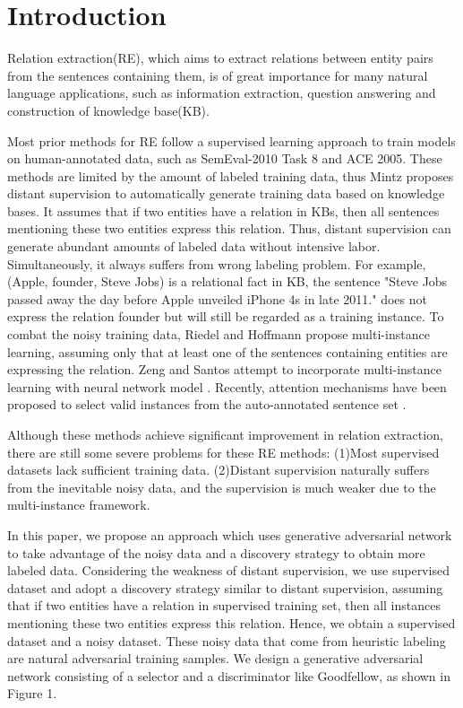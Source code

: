 \documentclass[conference]{IEEEtran}
\begin{document}
\section{Introduction}
Relation extraction(RE), which aims to extract relations between entity pairs from the sentences containing them, is of great importance for many
natural language applications, such as information extraction, question answering and 
construction of knowledge base(KB)\cite{Fader2011IdentifyingRF, Xu2016Question, Bollacker2008FreebaseAC}.

Most prior methods for RE follow a supervised learning approach to train models on human-annotated data, such as SemEval-2010 Task 8\cite{hendrickx2009semeval} and ACE 2005\cite{Ace2005}.
These methods are limited by the amount of labeled training data, thus Mintz\cite{mintz2009distant} proposes distant supervision to automatically generate training data based on knowledge bases.
It assumes that if two entities have a relation in KBs, then all sentences mentioning these two entities express this relation.
Thus, distant supervision can generate abundant amounts of labeled data without intensive labor.
Simultaneously, it always suffers from wrong labeling problem.
For example, (Apple, founder, Steve Jobs) is a relational fact in KB, the sentence "Steve Jobs passed away the day before Apple unveiled iPhone 4s in late 2011." does not express the relation founder but will still be regarded as a training instance.
To combat the noisy training data, Riedel and Hoffmann \cite{riedel2010modeling, hoffmann2011knowledge} propose multi-instance learning, assuming only that at least one of the sentences containing
entities are expressing the relation.
Zeng and Santos attempt to incorporate multi-instance learning with neural network model \cite{zeng2015distant, zeng2016incorporating, santos2015classifying}.
Recently, attention mechanisms have been proposed to select valid instances from the auto-annotated sentence set \cite{lin2016neural, ZHOU2018240}.

Although these methods achieve significant improvement in relation extraction, there are still some severe problems for these RE methods:
(1)Most supervised datasets lack sufficient training data.
(2)Distant supervision naturally suffers from the inevitable noisy data, and the supervision is much weaker due to the multi-instance framework.

In this paper, we propose an approach which uses generative adversarial network to take advantage of the noisy data and a discovery strategy to obtain more labeled data.
Considering the weakness of distant supervision, we use supervised dataset and adopt a discovery strategy similar to distant supervision, assuming that if two entities have a relation in supervised training set, then all
instances mentioning these two entities express this relation.
Hence, we obtain a supervised dataset and a noisy dataset.
These noisy data that come from heuristic labeling are natural adversarial training samples.
We design a generative adversarial network consisting of a selector and a discriminator like Goodfellow\cite{goodfellow2014explaining}, as shown in Figure 1.
\end{document}

